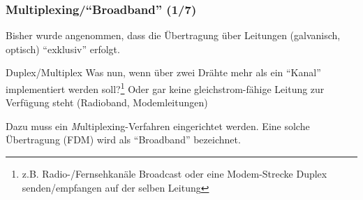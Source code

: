 \documentclass[ignorenonframetext]{beamer}
\begin{document}
\begin{frame}
\frametitle{Multiplexing/``Broadband'' (1/7)}
Bisher wurde angenommen, dass die \"Ubertragung \"uber Leitungen (galvanisch, optisch) ``exklusiv'' erfolgt.
\begin{block}{Duplex/Multiplex}
Was nun, wenn \"uber zwei Dr\"ahte mehr als ein ``Kanal'' implementiert werden soll?\footnote{z.B. Radio-/Fernsehkan\"ale Broadcast oder eine Modem-Strecke Duplex senden/empfangen auf der selben Leitung} Oder gar keine gleichstrom-f\"ahige Leitung zur Verf\"ugung steht (Radioband, Modemleitungen)
\end{block}

Dazu muss ein {\emph Multiplexing}-Verfahren eingerichtet werden. Eine solche \"Ubertragung (FDM) wird als ``Broadband'' bezeichnet.
\end{frame}
\end{document}
